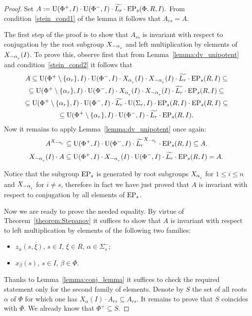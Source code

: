 \begin{proof} Set $A:=\operatorname{U}(\Phi^+, I)\cdot \operatorname{U}(\Phi^-, I) \cdot \widetilde{L_r} \cdot \operatorname{EP}_s(\Phi, R, I).$
From condition~\ref{stein_cond1} of the lemma it follows that $A_{rs}=A$.

The first step of the proof is to show that $A_{rs}$ is invariant with respect to conjugation by the root subgroup $X_{-\alpha\ssub{r}}$ 
and left multiplication by elements of $X_{-\alpha\ssub{r}}(I)$. To prove this, observe first that from Lemma~\ref{lemma:dv_unipotent} and condition~\ref{stein_cond2} it follows that
\begin{multline}\nonumber 
A \subseteq \U(\Phi^+\setminus \{\alpha_r\}, I) \cdot \U(\Phi^-, I) \cdot X_{\alpha\ssub{r}}(I) \cdot X_{-\alpha\ssub{r}}(I) \cdot \widetilde{L_r} \cdot \EP_s(R, I) \subseteq \\ 
\subseteq \U(\Phi^+\setminus\{\alpha_r\}, I) \cdot \U(\Phi^-, I) \cdot X_{\alpha\ssub{r}}(I) \cdot X_{-\alpha\ssub{r}}(I) \cdot \widetilde{L_r} \cdot \EP_s(R, I) \subseteq \\
\subseteq \U(\Phi^+\setminus\{\alpha_r\}, I) \cdot \U(\Phi^-, I) \cdot \widetilde{L_r} \cdot \U(\Sigma_r, I) \cdot \EP_s(R, I)  \cdot \EP_s(R, I) \subseteq \\
\subseteq \U(\Phi^+\setminus\{\alpha_r\}, I) \cdot \U(\Phi^-, I) \cdot \widetilde{L_r} \cdot \EP_s(R, I). \end{multline}
Now it remains to apply Lemma~\ref{lemma:dv_unipotent} once again:
\begin{equation}\nonumber A^{X_{-\alpha\ssub{r}}} \subseteq \U(\Phi^+, I) \cdot \U(\Phi^-, I) \cdot \widetilde{L_r} ^{X_{-\alpha\ssub{r}}} \cdot \EP_s(R, I) \subseteq A. \end{equation}
\begin{equation}\nonumber X_{-\alpha\ssub{r}}(I) \cdot A \subseteq \U(\Phi^+, I) \cdot X_{-\alpha\ssub{r}}(I) \cdot \U(\Phi^-, I) \cdot \widetilde{L_r} \cdot \EP_s(R, I) = A. \end{equation}

Notice that the subgroup $\operatorname{EP}_s$ is generated by root subgroups $X_{\alpha\ssub{i}}$ for $1\leq i\leq n$ and $X_{-\alpha\ssub{i}}$ for $i\neq s$,
therefore in fact we have just proved that $A$ is invariant with respect to conjugation by all elements of $\operatorname{EP}_s$.

Now we are ready to prove the needed equality. By virtue of Theorem~\ref{theorem:Stepanov} it suffices to show that
$A$ is invariant with respect to left multiplication by elements of the following two families:
\begin{itemize} \item $z_{\alpha}(s, \xi)$, $s\in I$, $\xi \in R$, $\alpha\in\Sigma^-_s$;
 \item $x_{\beta}(s)$, $s \in I$, $\beta \in \Phi$. \end{itemize}
Thanks to Lemma~\ref{lemma:conj_lemma} it suffices to check the required statement only for the second family of elements.
Denote by $S$ the set of all roots $\alpha$ of $\Phi$ for which one has $X_{\alpha}(I)\cdot A_{rs}\subseteq A_{rs}$.
It remains to prove that $S$ coincides with $\Phi$. We already know that $\Phi^+ \subseteq S$.


\end{proof}
